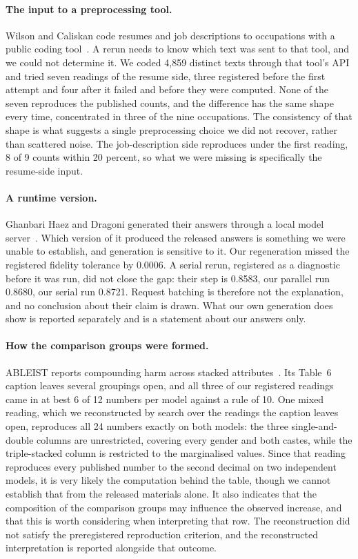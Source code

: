 \paragraph{The input to a preprocessing tool.} Wilson and Caliskan code resumes and job descriptions to occupations with a
public coding tool~\cite{wilson2024}. A rerun needs to know which text was sent
to that tool, and we could not determine it. We coded 4{,}859 distinct texts
through that tool's API and tried seven readings of the resume side, three
registered before the first attempt and four after it failed and before they
were computed. None of the seven reproduces the published counts, and the difference has the
same shape every time, concentrated in three of the nine occupations. The
consistency of that shape is what suggests a single preprocessing choice we did
not recover, rather than scattered noise. The job-description side reproduces under the first reading, 8 of 9 counts
within 20 percent, so what we were missing is specifically the resume-side
input.

\paragraph{A runtime version.} Ghanbari Haez and Dragoni generated their answers through a local model
server~\cite{ghanbari2025}. Which version of it produced the released answers
is something we were unable to establish, and generation is sensitive to it. Our
regeneration missed the registered fidelity tolerance by 0.0006. A serial rerun,
registered as a diagnostic before it was run, did not close the gap: their step
is 0.8583, our parallel run 0.8680, our serial run 0.8721. Request batching is
therefore not the explanation, and no conclusion about their claim is drawn. What our own generation does show is
reported separately and is a statement about our answers only.

\paragraph{How the comparison groups were formed.} ABLEIST reports compounding
harm across stacked attributes~\cite{ableist2025}. Its Table~6 caption leaves
several groupings open, and all three of our registered readings came in at best
6 of 12 numbers per model against a rule of 10. One mixed reading, which we
reconstructed by search over the readings the caption leaves open, reproduces
all 24 numbers exactly on both models: the three single-and-double columns are
unrestricted, covering every gender and both castes, while the triple-stacked
column is restricted to the marginalised values. Since that reading reproduces every published number to the second decimal on
two independent models, it is very likely the computation behind the table,
though we cannot establish that from the released materials alone. It also
indicates that the composition of the comparison groups may influence the
observed increase, and that this is worth considering when interpreting that
row. The reconstruction did not satisfy the preregistered reproduction criterion, and
the reconstructed interpretation is reported alongside that outcome.

